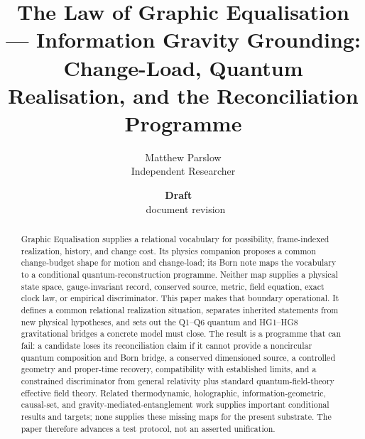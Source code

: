 \documentclass[11pt,a4paper]{article}
\title{The Law of Graphic Equalisation --- Information Gravity Grounding:\\
\large Change-Load, Quantum Realisation, and the Reconciliation Programme}
\author{Matthew Parslow\\Independent Researcher}
\date{\textbf{Draft \texorpdfstring{\textemdash}{---}\ \PaperDraft}\\[2pt]\PaperDisplayDate \texorpdfstring{\textbullet}{\textperiodcentered}\ document revision \PaperRevision}
\theoremstyle{remark}
\begin{document}
\maketitle
\begin{center}
\end{center}
\vspace{1em}

\begin{abstract}
Graphic Equalisation supplies a relational vocabulary for possibility,
frame-indexed realization, history, and change cost. Its physics companion
proposes a common change-budget shape for motion and change-load; its Born note
maps the vocabulary to a conditional quantum-reconstruction programme. Neither
map supplies a physical state space, gauge-invariant record, conserved source,
metric, field equation, exact clock law, or empirical discriminator. This paper
makes that boundary operational. It defines a common relational realization
situation, separates inherited statements from new physical hypotheses, and
sets out the Q1--Q6 quantum and HG1--HG8 gravitational bridges a concrete model
must close. The result is a programme that can fail: a candidate loses its
reconciliation claim if it cannot provide a noncircular quantum composition and
Born bridge, a conserved dimensioned source, a controlled geometry and
proper-time recovery, compatibility with established limits, and a constrained
discriminator from general relativity plus standard quantum-field-theory
effective field theory. Related thermodynamic, holographic,
information-geometric, causal-set, and gravity-mediated-entanglement work
supplies important conditional results and targets; none supplies these missing
maps for the present substrate. The paper therefore advances a test protocol,
not an asserted unification.
\end{abstract}
\end{document}
